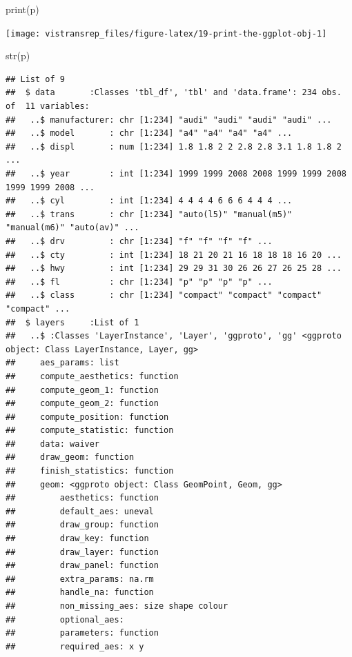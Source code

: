 \documentclass[]{book}
\newenvironment{Shaded}{}{}
\newcommand{\KeywordTok}[1]{\textcolor[rgb]{0.00,0.00,1.00}{#1}}
\newcommand{\NormalTok}[1]{#1}
\begin{document}
\begin{Shaded}
\begin{Highlighting}[]
\KeywordTok{print}\NormalTok{(p)}
\end{Highlighting}
\end{Shaded}

\begin{flushright}\texttt{[image: vistransrep\_files/figure-latex/19-print-the-ggplot-obj-1]} \end{flushright}

\begin{Shaded}
\begin{Highlighting}[]
\KeywordTok{str}\NormalTok{(p)}
\end{Highlighting}
\end{Shaded}

\begin{verbatim}
## List of 9
##  $ data       :Classes 'tbl_df', 'tbl' and 'data.frame': 234 obs. of  11 variables:
##   ..$ manufacturer: chr [1:234] "audi" "audi" "audi" "audi" ...
##   ..$ model       : chr [1:234] "a4" "a4" "a4" "a4" ...
##   ..$ displ       : num [1:234] 1.8 1.8 2 2 2.8 2.8 3.1 1.8 1.8 2 ...
##   ..$ year        : int [1:234] 1999 1999 2008 2008 1999 1999 2008 1999 1999 2008 ...
##   ..$ cyl         : int [1:234] 4 4 4 4 6 6 6 4 4 4 ...
##   ..$ trans       : chr [1:234] "auto(l5)" "manual(m5)" "manual(m6)" "auto(av)" ...
##   ..$ drv         : chr [1:234] "f" "f" "f" "f" ...
##   ..$ cty         : int [1:234] 18 21 20 21 16 18 18 18 16 20 ...
##   ..$ hwy         : int [1:234] 29 29 31 30 26 26 27 26 25 28 ...
##   ..$ fl          : chr [1:234] "p" "p" "p" "p" ...
##   ..$ class       : chr [1:234] "compact" "compact" "compact" "compact" ...
##  $ layers     :List of 1
##   ..$ :Classes 'LayerInstance', 'Layer', 'ggproto', 'gg' <ggproto object: Class LayerInstance, Layer, gg>
##     aes_params: list
##     compute_aesthetics: function
##     compute_geom_1: function
##     compute_geom_2: function
##     compute_position: function
##     compute_statistic: function
##     data: waiver
##     draw_geom: function
##     finish_statistics: function
##     geom: <ggproto object: Class GeomPoint, Geom, gg>
##         aesthetics: function
##         default_aes: uneval
##         draw_group: function
##         draw_key: function
##         draw_layer: function
##         draw_panel: function
##         extra_params: na.rm
##         handle_na: function
##         non_missing_aes: size shape colour
##         optional_aes: 
##         parameters: function
##         required_aes: x y

\end{verbatim}
\end{document}
